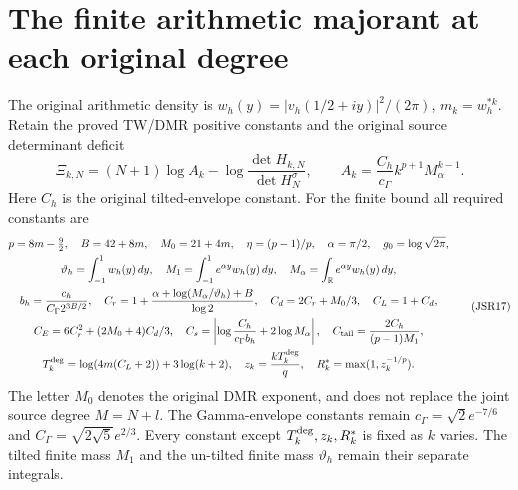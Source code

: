\documentclass[11pt,a4paper]{article}
\newcommand{\R}{\mathbb R}
\begin{document}
\section{The finite arithmetic majorant at each original degree}

The original arithmetic density is
$w_h(y)=|v_h(1/2+iy)|^2/(2\pi)$, $m_k=w_h^{*k}$.
Retain the proved TW/DMR positive constants and the original
source determinant deficit
\[
 \Xi_{k,N}=(N+1)\log A_k
       -\log\frac{\det H_{k,N}}{\det H_N^\sigma},\qquad
 A_k=\frac{C_h}{c_\Gamma}k^{p+1}M_\alpha^{k-1}.
 \tag{JSR16}
\]
Here $C_h$ is the original tilted-envelope constant. For the
finite bound all required constants are
\[
\begin{gathered}
 p=8m-\tfrac92,\quad B=42+8m,\quad M_0=21+4m,\quad
 \eta=(p-1)/p,\quad\alpha=\pi/2,\quad g_0=\log\sqrt{2\pi},\\
 \vartheta_h=\int_{-1}^1w_h(y)\,dy,\quad
 M_1=\int_{-1}^1e^{\alpha y}w_h(y)\,dy,\quad
 M_\alpha=\int_{\R}e^{\alpha y}w_h(y)\,dy,\\
 b_h=\frac{c_h}{C_\Gamma2^{3B/2}},\quad
 C_r=1+\frac{\alpha+\log(M_\alpha/\vartheta_h)+B}{\log2},\quad
 C_d=2C_r+M_0/3,\quad C_L=1+C_d,\\
 C_E=6C_r^2+(2M_0+4)C_d/3,\quad
 C_s=\left|\log\frac{C_h}{c_\Gamma b_h}+2\log M_\alpha\right|,
 \quad C_{\rm tail}=\frac{2C_h}{(p-1)M_1},\\
 T_k^{\rm deg}=\log(4m(C_L+2))+3\log(k+2),\quad
 z_k=\frac{kT_k^{\rm deg}}q,\quad R_k^*=\max(1,z_k^{-1/p}).
\end{gathered}\tag{JSR17}
\]
The letter $M_0$ denotes the original DMR exponent, and does
not replace the joint source degree $M=N+l$.
The Gamma-envelope constants remain
$c_\Gamma=\sqrt2e^{-7/6}$ and
$C_\Gamma=\sqrt{2\sqrt5}e^{2/3}$.
Every constant except $T_k^{\rm deg},z_k,R_k^*$ is fixed
as $k$ varies. The tilted finite mass $M_1$ and the
un-tilted finite mass $\vartheta_h$ remain their separate integrals.
\end{document}
